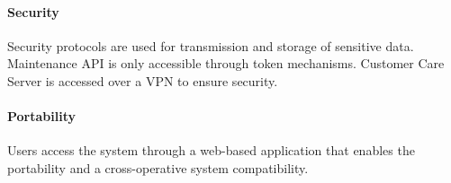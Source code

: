         \paragraph{Security}
        Security protocols are used for transmission and storage of sensitive data.
        Maintenance API is only accessible through token mechanisms.
        Customer Care Server is accessed over a VPN to ensure security. 

        \paragraph{Portability}
        Users access the system through a web-based application that enables the portability and a cross-operative system compatibility.
 